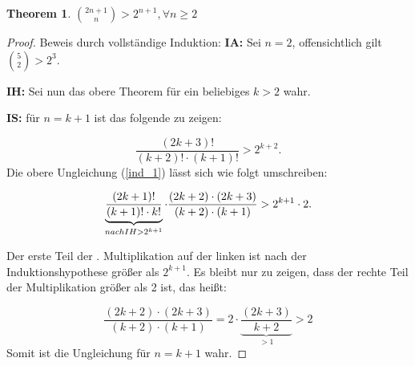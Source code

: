 \documentclass[12pt,oneside]{article}
\newtheorem{theorem}{Theorem}[section]
\theoremstyle{remark}
\theoremstyle{definition}
\begin{document}
\begin{flushleft}
\begin{theorem}\label{useful_theorem_for_proof}
${2n + 1 \choose n} > 2^{n+1}, \forall n \geq 2$
\end{theorem}

\begin{proof}
Beweis durch vollständige Induktion:\newline\newline
\textbf{IA: } Sei $n = 2$, offensichtlich gilt ${5 \choose 2} > 2^3$.\newline\newline

\textbf{IH: }Sei nun das obere Theorem für ein beliebiges $k > 2 $ wahr.\newline\newline

\textbf{IS: }für $n = k + 1$ ist das folgende zu zeigen: 

\begin{equation}\label{ind_1}
    \frac{(2k + 3)!}{(k + 2)!\cdot(k + 1)!} > 2^{k+2}.
\end{equation}
\newline\newline
Die obere Ungleichung (\ref{ind_1}) lässt sich wie folgt umschreiben:\newline\newline


\begin{equation}
     \underbrace{\frac{(2k + 1)!}{(k + 1)! \cdot k!}}_{nach IH > 2^{k + 1}} \cdot \frac{(2k + 2) \cdot (2k + 3)}{(k + 2) \cdot (k + 1)} > 2^{k+1} \cdot 2.\newline\newline
\end{equation}

Der erste Teil der . Multiplikation auf der linken ist nach der Induktionshypothese größer als $2^{k+1}$. Es bleibt nur zu zeigen, dass der rechte Teil der Multiplikation größer als 2 ist, das heißt: \newline\newline

\begin{equation}\label{ind_eq}
\frac{(2k + 2) \cdot (2k + 3)}{(k + 2) \cdot (k + 1)} = 2 \cdot \underbrace{\frac{(2k + 3 )}{k + 2}}_{ > 1} > 2
\end{equation}
Somit ist die Ungleichung für $n = k + 1$ wahr.
\end{proof}

\end{flushleft}
\end{document}
